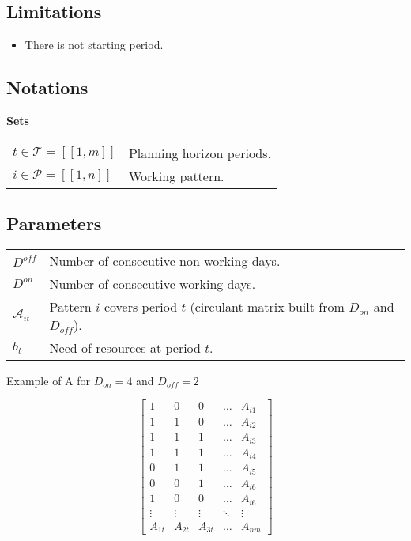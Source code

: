 \documentclass[a4paper,11pt]{article}
\begin{document}
    \subsection{Limitations}

    \begin{itemize}
        \item There is not starting period.
    \end{itemize}

    \subsection{Notations}

    \textbf{Sets}

    \begin{tabular}{ll}
    $t \in \mathcal{T} = [\![1, m]\!]$ & Planning horizon periods. \\
    $i \in \mathcal{P} = [\![1, n]\!]$ & Working pattern.\\
    \end{tabular}

    \vskip 0.3cm

    \subsection{Parameters}

    \begin{tabular}{ll}
        $D^{off}$ & Number of consecutive non-working days. \\
        $D^{on}$ & Number of consecutive working days. \\
        $\mathcal{A}_{it}$ & Pattern $i$ covers period $t$ (circulant matrix built from $D_{on}$ and $D_{off}$).\\
        $b_{t}$ & Need of resources at period $t$. \\
    \end{tabular}

    \vskip 0.3cm

    Example of A for $D_{on}=4$ and $D_{off}=2$

    $$
    \begin{bmatrix}
        1 & 0 & 0 & \dots  & A_{i1} \\
        1 & 1 & 0 & \dots  & A_{i2} \\
        1 & 1 & 1 & \dots  & A_{i3} \\
        1 & 1 & 1 & \dots  & A_{i4} \\
        0 & 1 & 1 & \dots  & A_{i5} \\
        0 & 0 & 1 & \dots  & A_{i6} \\
        1 & 0 & 0 & \dots  & A_{i6} \\
        \vdots & \vdots & \vdots & \ddots & \vdots \\
        A_{1t} & A_{2t} & A_{3t} & \dots  & A_{nm}
    \end{bmatrix}
    $$
\end{document}
